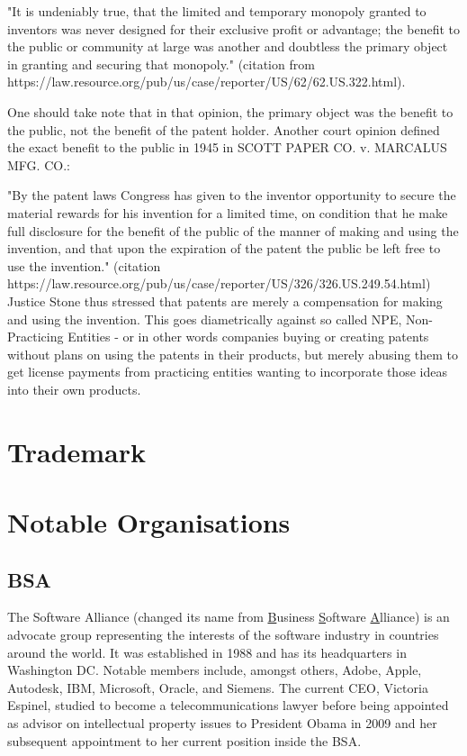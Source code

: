 \documentclass[a4paper]{report}
\begin{document}
"It is undeniably true, that the limited and temporary monopoly granted to inventors was never designed for their exclusive profit or advantage; the benefit to the public or community at large was another and doubtless the primary object in granting and securing that monopoly." (citation from https://law.resource.org/pub/us/case/reporter/US/62/62.US.322.html).

One should take note that in that opinion, the primary object was the benefit to the public, not the benefit of the patent holder. Another court opinion defined the exact benefit to the public in 1945 in SCOTT PAPER CO. v. MARCALUS MFG. CO.:

"By the patent laws Congress has given to the inventor opportunity to secure the material rewards for his invention for a limited time, on condition that he make full disclosure for the benefit of the public of the manner of making and using the invention, and that upon the expiration of the patent the public be left free to use the invention." (citation https://law.resource.org/pub/us/case/reporter/US/326/326.US.249.54.html) Justice Stone thus stressed that patents are merely a compensation for making and using the invention. This goes diametrically against so called NPE, Non-Practicing Entities - or in other words companies buying or creating patents without plans on using the patents in their products, but merely abusing them to get license payments from practicing entities wanting to incorporate those ideas into their own products.

\section{Trademark}
\label{sec:Trademark}

\section{Notable Organisations}
\label{sec:Orgas}

\subsection{BSA}
\label{ssec:BSA}
The Software Alliance (changed its name from \underline{B}usiness \underline{S}oftware \underline{A}lliance) is an advocate group representing the interests of the software industry in countries around the world. It was established in 1988 and has its headquarters in Washington DC. Notable members include, amongst others, Adobe, Apple, Autodesk, IBM, Microsoft, Oracle, and Siemens. The current CEO, Victoria Espinel, studied to become a telecommunications lawyer before being appointed as advisor on intellectual property issues to President Obama in 2009 and her subsequent appointment to her current position inside the BSA. \parencite{Rogers2017}
\vspace{\baselineskip}
\end{document}

